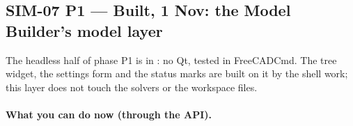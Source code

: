 \subsection{SIM-07 P1 --- Built, 1 Nov: the Model Builder's model layer}\label{sec:sim07-model-built}

The headless half of phase P1 is in : no Qt, tested in FreeCADCmd.
The tree widget, the settings form and the status marks are built on it by the shell work; this layer does not touch
the solvers or the workspace files.

\paragraph{What you can do now (through the API).}
